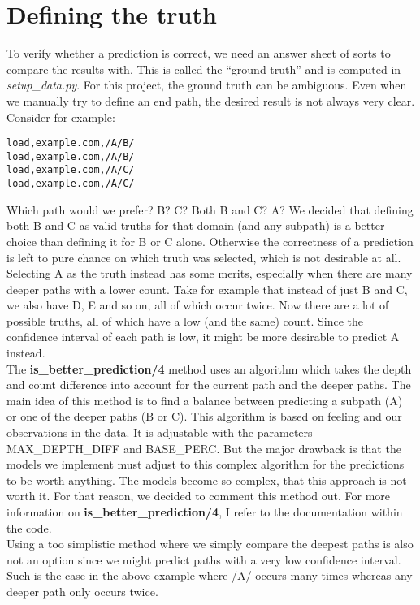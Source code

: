 \section{Defining the truth}\label{sec:truth}

To verify whether a prediction is correct, we need an answer sheet of sorts to compare the results with. This is called the ``ground truth'' and is computed in \textit{setup\_data.py}. For this project, the ground truth can be ambiguous. Even when we manually try to define an end path, the desired result is not always very clear. Consider for example:
\begin{lstlisting}
load,example.com,/A/B/
load,example.com,/A/B/
load,example.com,/A/C/
load,example.com,/A/C/
\end{lstlisting}
Which path would we prefer? B? C? Both B and C? A? We decided that defining both B and C as valid truths for that domain (and any subpath) is a better choice than defining it for B or C alone. Otherwise the correctness of a prediction is left to pure chance on which truth was selected, which is not desirable at all. Selecting A as the truth instead has some merits, especially when there are many deeper paths with a lower count. Take for example that instead of just B and C, we also have D, E and so on, all of which occur twice. Now there are a lot of possible truths, all of which have a low (and the same) count. Since the confidence interval of each path is low, it might be more desirable to predict A instead. 
\\[2ex]
The \textbf{is\_better\_prediction/4} method uses an algorithm which takes the depth and count difference into account for the current path and the deeper paths. The main idea of this method is to find a balance between predicting a subpath (A) or one of the deeper paths (B or C). This algorithm is based on feeling and our observations in the data. It is adjustable with the parameters MAX\_DEPTH\_DIFF and BASE\_PERC. But the major drawback is that the models we implement must adjust to this complex algorithm for the predictions to be worth anything. The models become so complex, that this approach is not worth it. For that reason, we decided to comment this method out. For more information on \textbf{is\_better\_prediction/4}, I refer to the documentation within the code.
\\[2ex]
Using a too simplistic method where we simply compare the deepest paths is also not an option since we might predict paths with a very low confidence interval. Such is the case in the above example where /A/ occurs many times whereas any deeper path only occurs twice.


